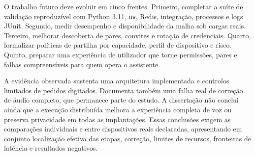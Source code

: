 O trabalho futuro deve evoluir em cinco frentes. Primeiro, completar a su\'{i}te de valida\c{c}\~{a}o reproduz\'{i}vel com Python 3.11, \texttt{uv}, Redis, integra\c{c}\~{a}o, processos e logs JUnit. Segundo, medir desempenho e disponibilidade da malha sob cargas reais. Terceiro, melhorar descoberta de pares, convites e rota\c{c}\~{a}o de credenciais. Quarto, formalizar pol\'{i}ticas de partilha por capacidade, perfil de dispositivo e risco. Quinto, preparar uma experi\^{e}ncia de utilizador que torne permiss\~{o}es, pares e falhas compreens\'{i}veis para quem opera o assistente.

A evidência observada sustenta uma arquitetura implementada e controlos limitados de pedidos digitados. Documenta também uma falha real de correção de áudio completo, que permanece parte do estudo. A dissertação não conclui ainda que a execução distribuída melhora a experiência completa de voz ou preserva privacidade em todas as implantações. Essas conclusões exigem as comparações individuais e entre dispositivos reais declaradas, apresentando em conjunto localização efetiva das etapas, correção, limites de recursos, fronteiras de latência e resultados negativos.